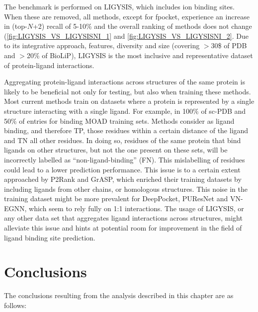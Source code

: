The benchmark is performed on LIGYSIS, which includes ion binding sites. When these are removed, all methods, except for fpocket, experience an increase in (top-$N$+2) recall of 5-10\% and the overall ranking of methods does not change (\autoref{fig:LIGYSIS_VS_LIGYSISNI_1} and \autoref{fig:LIGYSIS_VS_LIGYSISNI_2}. Due to its integrative approach, features, diversity and size (covering $>$30\$ of PDB and $>$20\% of BioLiP), LIGYSIS is the most inclusive and representative dataset of protein-ligand interactions.

Aggregating protein-ligand interactions across structures of the same protein is likely to be beneficial not only for testing, but also when training these methods. Most current methods train on datasets where a protein is represented by a single structure interacting with a single ligand. For example, in 100\% of sc-PDB and 50\% of entries for binding MOAD training sets. Methods consider as ligand binding, and therefore TP, those residues within a certain distance of the ligand and TN all other residues. In doing so, residues of the same protein that bind ligands on other structures, but not the one present on these sets, will be incorrectly labelled as ``non-ligand-binding'' (FN). This mislabelling of residues could lead to a lower prediction performance. This issue is to a certain extent approached by P2Rank and GrASP, which enriched their training datasets by including ligands from other chains, or homologous structures. This noise in the training dataset might be more prevalent for DeepPocket, PUResNet and VN-EGNN, which seem to rely fully on 1:1 interactions. The usage of LIGYSIS, or any other data set that aggregates ligand interactions across structures, might alleviate this issue and hints at potential room for improvement in the field of ligand binding site prediction.

\section{Conclusions}

The conclusions resulting from the analysis described in this chapter are as follows:

